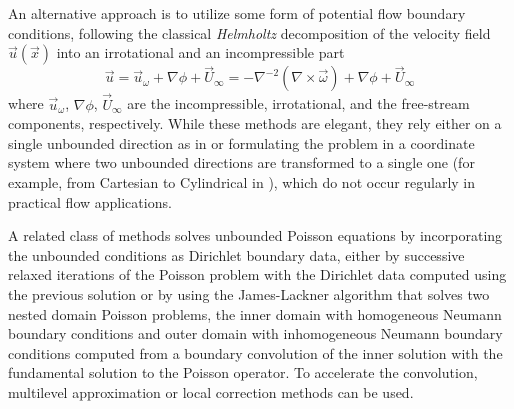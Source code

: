 \documentclass[final,1p,times]{elsarticle}
\begin{document}
An alternative approach is to utilize some form of potential flow boundary conditions, following the classical \emph{Helmholtz} decomposition of the velocity field $\vec u(\vec x)$ into an irrotational and an incompressible part
\begin{equation}\label{eq:u_vort}
    \vec{u} = \vec{u}_\omega + \nabla\phi + \vec{U}_\infty = -\nabla^{-2}\left(\nabla \times \vec{\omega}\right) + \nabla\phi + \vec{U}_\infty
\end{equation}
where $\vec{u}_\omega$, $\nabla\phi$, $\vec{U}_\infty$ are the incompressible, irrotational, and the free-stream components, respectively. While these methods are elegant, they rely either on a single unbounded direction as in \cite{Grosch1977NumericalTransforms} or formulating the problem in a coordinate system where two unbounded directions are transformed to a single one (for example, from Cartesian to Cylindrical in \cite{Levy2022SolvingMethod}), which do not occur regularly in practical flow applications.

A related class of methods solves unbounded Poisson equations by incorporating the unbounded conditions as Dirichlet boundary data, either by successive relaxed iterations of the Poisson problem with the Dirichlet data computed using the previous solution \cite{Miller2008AnBoundaries} or by using the James-Lackner \cite{Jamb1977TheDistributions, Lackner1976COMPUTATIONEQUILIBRIA} algorithm that solves two nested domain Poisson problems, the inner domain with homogeneous Neumann boundary conditions and outer domain with inhomogeneous Neumann boundary conditions computed from a boundary convolution of the inner solution with the fundamental solution to the Poisson operator. To accelerate the convolution, multilevel approximation \cite{Mccorquodale2006ADimensions} or local correction methods \cite{Kavouklis2019ComputationCorrections} can be used.
\end{document}
